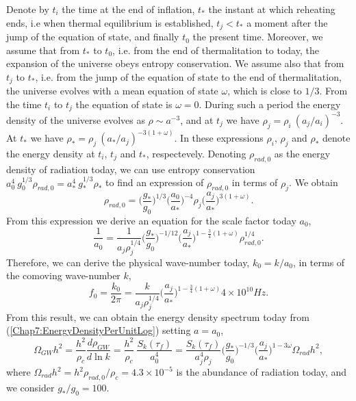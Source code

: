 \documentclass[11pt,a4paper,twoside]{book}
\begin{document}
Denote by $ t_{i} $ the time at the end of inflation, $ t_{*} $ the instant at which reheating ends, i.e when thermal equilibrium is established, $ t_{j} < t_{*} $ a moment after the jump of the equation of state, and finally $ t_{0} $ the present time. Moreover, we assume that from $ t_{*} $ to $ t_{0} $, i.e. from the end of thermalitation to today, the expansion of the universe obeys entropy conservation. We assume also that from $ t_{j} $ to $ t_{*} $, i.e. from the jump of the equation of state to the end of thermalitation, the universe evolves with a mean equation of state $\omega$, which is close to $ 1/3 $.
From the time $ t_{i} $ to $ t_{j} $ the equation of state is $\omega = 0$. During such a period the energy density of the universe evolves as $\rho \sim a^{-3}$, and at $ t_{j} $ we have $\rho_{j}=\rho_{i}\ (a_{j}/a_{i})^{-3}$. At $ t_{*} $ we have $ \rho_{*}=\rho_{j}\ (a_{*}/a_{j})^{-3(1+\omega)} $. In these expressions $\rho_{i}$, $ \rho_{j} $ and $ 	\rho_{*} $ denote the energy density at $ t_{i} $, $ t_{j} $ and $ t_{*} $, respectevely. Denoting $\rho_{rad,0}$ as the energy density of radiation today, we can use entropy conservation $ a_{0}^{4}\ g_{0}^{1/3}\rho_{rad,0}=a_{*}^{4}\ g_{*}^{1/3}\rho_{*} $ to find an expression of $\rho_{rad,0}$ in terms of $ \rho_{j} $. We obtain 
\begin{equation}
\label{Chap7:ExpressionEnergyDensity}
\rho_{rad,0}=\Bigg(\frac{g_{*}}{g_{0}}\Bigg)^{1/3}\Bigg(\frac{a_{0}}{a_{*}}\Bigg)^{-4}\rho_{j}\Bigg(\frac{a_{j}}{a_{*}}\Bigg)^{3(1+\omega)}.
\end{equation}
From this expression we derive an equation for the scale factor today $ a_{0} $,
\begin{equation}
\label{Chap7:scaleFactorToday}
\frac{1}{a_{0}}= \frac{1}{a_{j}\rho_{j}^{1/4}}\Bigg(\frac{g_{*}}{g_{0}}\Bigg)^{-1/12}\Bigg(\frac{a_{j}}{a_{*}}\Bigg)^{1-\frac{3}{4}(1+\omega)}\rho_{rad,0}^{1/4}.
\end{equation}
Therefore, we can derive the physical wave-number today, $ k_{0}=k/a_{0} $, in terms of the comoving wave-number $ k $,
\begin{equation}
\label{Chap7:frequencyToday}
f_{0}=\frac{k_{0}}{2\pi}=\frac{k}{a_{j}\rho_{j}^{1/4}}\Bigg(\frac{a_{j}}{a_{*}}\Bigg)^{1-\frac{3}{4}(1+\omega)} 4 \times 10^{10} Hz.
\end{equation}
From this result, we can obtain the energy density spectrum today from (\ref{Chap7:EnergyDensityPerUnitLog}) setting $ a=a_{0} $,
\begin{equation}
\label{Chap7spectrumToday}
\Omega_{GW}h^{2}=\frac{h^{2}}{\rho_{c}}\frac{d\rho_{GW}}{d\ln k}
= \frac{h^{2}}{\rho_{c}}\ \frac{S_{k}(\tau_{f})}{a_{0}^{4}}
=\frac{S_{k}(\tau_{f})}{a_{j}^{4}\rho_{j}}\Bigg(\frac{g_{*}}{g_{0}}\Bigg)^{-1/3}\Bigg(\frac{a_{j}}{a_{*}}\Bigg)^{1-3\omega}\Omega_{rad}h^{2},
\end{equation}
where $\Omega_{rad}h^{2} = h^{2} \rho_{rad,0}/\rho_{c} = 4.3 \times 10^{-5}$ is the abundance of radiation today, and we consider $ g_{*}/g_{0}=100 $.
\end{document}
